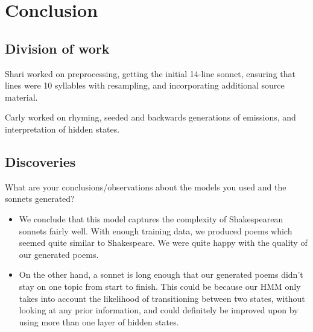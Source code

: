 \section{Conclusion}
\subsection{Division of work}
Shari worked on preprocessing, getting the initial 14-line sonnet, ensuring that lines were 10 syllables with resampling, and incorporating additional source material.

Carly worked on rhyming, seeded and backwards generations of emissions, and interpretation of hidden states.

\subsection{Discoveries}
What are your conclusions/observations about the models you used and the sonnets generated?
\begin{itemize}
	\item We conclude that this model captures the complexity of Shakespearean sonnets fairly well.  With enough training data, we produced poems which seemed quite similar to Shakespeare.  We were quite happy with the quality of our generated poems.  
	\item On the other hand, a sonnet is long enough that our generated poems didn't stay on one topic from start to finish.  This could be because our HMM only takes into account the likelihood of transitioning between two states, without looking at any prior information, and could definitely be improved upon by using more than one layer of hidden states.
\end{itemize}

